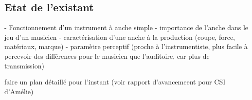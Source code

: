 \subsection{Etat de l'existant}

    - Fonctionnement d'un instrument à anche simple
    - importance de l'anche dans le jeu d'un musicien
    - caractérisation d'une anche à la production (coupe, force, matériaux, marque)
    - paramètre perceptif (proche à l'instrumentiste, plus facile à percevoir des différences pour le musicien que l'auditoire, car plus de transmission)

    faire un plan détaillé pour l'instant (voir rapport d'avancemeent pour CSI d'Amélie)


    